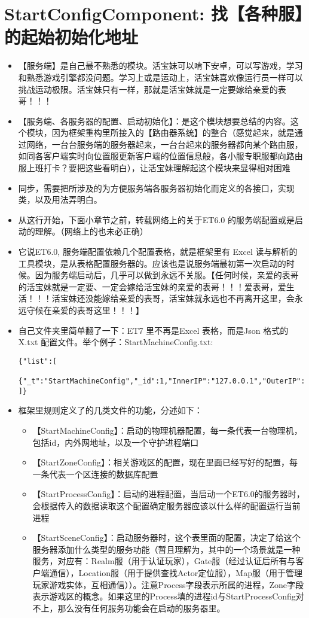 \documentclass[9pt, b5paper]{article}
\begin{document}
\section{StartConfigComponent: 找【各种服】的起始初始化地址}
\label{sec-6}
\begin{itemize}
\item 【服务端】是自己最不熟悉的模块。活宝妹可以啃下安卓，可以写游戏，学习和熟悉游戏引擎都没问题。学习上或是运动上，活宝妹喜欢像运行员一样可以挑战运动极限。活宝妹只有一样，那就是活宝妹就是一定要嫁给亲爱的表哥！！！
\item 【服务端、各服务器的配置、启动初始化】：是这个模块想要总结的内容。这个模块，因为框架重构里所接入的【路由器系统】的整合（感觉起来，就是通过网络，一台台服务端的服务器起来，一台台起来的服务器都向某个路由服，如同各客户端实时向位置服更新客户端的位置信息般，各小服专职服都向路由服上班打卡？要把这些看明白），让活宝妹理解起这个模块来显得相对困难
\item 同步，需要把所涉及的为方便服务端各服务器初始化而定义的各接口，实现类，以及用法弄明白。
\item 从这行开始，下面小章节之前，转载网络上的关于ET6.0 的服务端配置或是启动的理解。（网络上的也未必正确）
\item 它说ET6.0, 服务端配置依赖几个配置表格，就是框架里有 Excel 读与解析的工具模块，是从表格配置服务器的。应该也是说服务端最初第一次启动的时候。因为服务端启动后，几乎可以做到永远不关服。【任何时候，亲爱的表哥的活宝妹就是一定要、一定会嫁给活宝妹的亲爱的表哥！！！爱表哥，爱生活！！！活宝妹还没能嫁给亲爱的表哥，活宝妹就永远也不再离开这里，会永远守候在亲爱的表哥这里！！！】
\item 自己文件夹里简单翻了一下：ET7 里不再是Excel 表格，而是Json 格式的 X.txt 配置文件。举个例子：StartMachineConfig.txt:
\begin{verbatim}
{"list":[
    {"_t":"StartMachineConfig","_id":1,"InnerIP":"127.0.0.1","OuterIP":"127.0.0.1","WatcherPort":"10000"},
]}
\end{verbatim}
\item 框架里规则定义了的几类文件的功能，分述如下：
\begin{itemize}
\item 【StartMachineConfig】：启动的物理机器配置，每一条代表一台物理机，包括id，内外网地址，以及一个守护进程端口
\item 【StartZoneConfig】：相关游戏区的配置，现在里面已经写好的配置，每一条代表一个区连接的数据库配置
\item 【StartProcessConfig】：启动的进程配置，当启动一个ET6.0的服务器时，会根据传入的数据读取这个配置确定服务器应该以什么样的配置运行当前进程
\item 【StartSceneConfig】：启动服务器时，这个表里面的配置，决定了给这个服务器添加什么类型的服务功能（暂且理解为，其中的一个场景就是一种服务，对应有：Realm服（用于认证玩家），Gate服（经过认证后所有与客户端通信），Location服（用于提供查找Actor定位服），Map服（用于管理玩家游戏实体，互相通信））。注意Process字段表示所属的进程，Zone字段表示游戏区的概念。如果这里的Process填的进程id与StartProcessConfig对不上，那么没有任何服务功能会在启动的服务器里。
\end{itemize}
\end{itemize}
\end{document}
